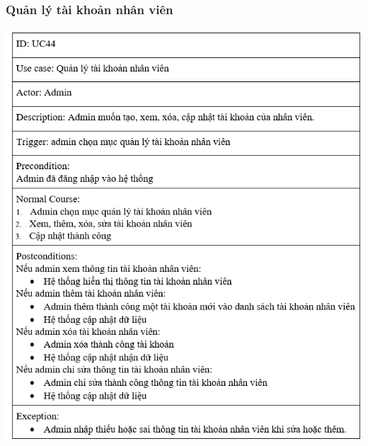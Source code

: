\documentclass[12pt,a4paper,2sides]{report}
\begin{document}
\subsubsection{Quản lý tài khoản nhân viên}
    \includegraphics[width=1\linewidth]{lib/usecase/quanlytknv.png}\\\vspace*{1cm} 
\end{document}
